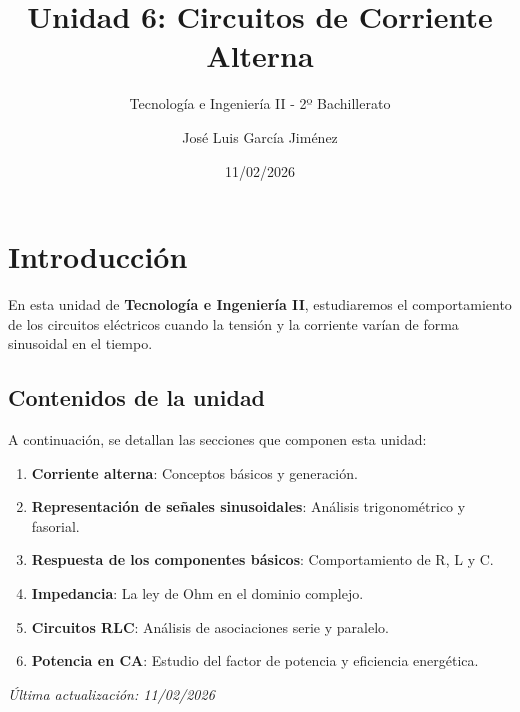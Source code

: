 \documentclass[
  a4paper,
  DIV=11,
  numbers=noendperiod]{scrreprt}
\title{Unidad 6: Circuitos de Corriente Alterna}
\subtitle{Tecnología e Ingeniería II - 2º Bachillerato}
\author{José Luis García Jiménez}
\date{11/02/2026}
\providecommand{\tightlist}{%
  \setlength{\itemsep}{0pt}\setlength{\parskip}{0pt}}
\renewcommand*\contentsname{Índice de contenidos}
\newcommand\contentsname{Índice de contenidos}
\begin{document}
\maketitle

\renewcommand*\contentsname{Índice de contenidos}
{
\hypersetup{linkcolor=}
\setcounter{tocdepth}{2}
\tableofcontents
}


\chapter*{Introducción}\label{introducciuxf3n}


En esta unidad de \textbf{Tecnología e Ingeniería II}, estudiaremos el
comportamiento de los circuitos eléctricos cuando la tensión y la
corriente varían de forma sinusoidal en el tiempo.

\section*{Contenidos de la unidad}\label{contenidos-de-la-unidad}


A continuación, se detallan las secciones que componen esta unidad:

\begin{enumerate}
\def\labelenumi{\arabic{enumi}.}
\tightlist
\item
  \textbf{Corriente alterna}: Conceptos básicos y generación.
\item
  \textbf{Representación de señales sinusoidales}: Análisis
  trigonométrico y fasorial.
\item
  \textbf{Respuesta de los componentes básicos}: Comportamiento de R, L
  y C.
\item
  \textbf{Impedancia}: La ley de Ohm en el dominio complejo.
\item
  \textbf{Circuitos RLC}: Análisis de asociaciones serie y paralelo.
\item
  \textbf{Potencia en CA}: Estudio del factor de potencia y eficiencia
  energética.
\end{enumerate}

\emph{Última actualización: 11/02/2026}

\end{document}
